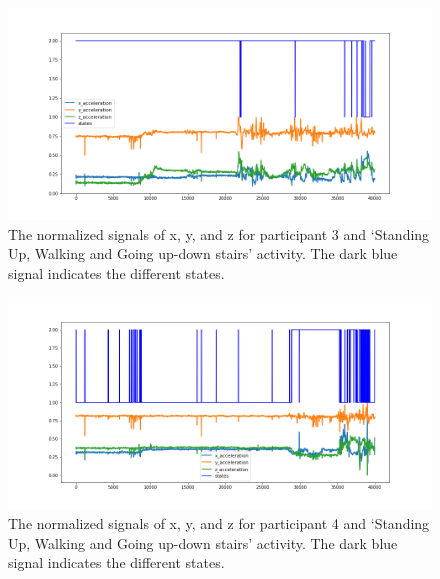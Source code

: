 \begin{figure}[H]
    \centering
    \begin{minipage}[b]{1\textwidth}
        \includegraphics[width=\textwidth]{manuscript/src/figures/Ass3/Ass3_Q2_states_user_2N.png}
    \end{minipage}
    \caption{The normalized signals of x, y, and z for participant 3 and ‘Standing  Up,  Walking  and  Going  up-down  stairs’ activity. The dark blue signal indicates the different states.}
    \label{fig:Ass3_Q2_states_user_2N}
\end{figure}
\begin{figure}[H]
    \centering
    \begin{minipage}[b]{1\textwidth}
        \includegraphics[width=\textwidth]{manuscript/src/figures/Ass3/Ass3_Q2_states_user_3N.png}
    \end{minipage}
    \caption{The normalized signals of x, y, and z for participant 4 and ‘Standing  Up,  Walking  and  Going  up-down  stairs’ activity. The dark blue signal indicates the different states.}
    \label{fig:Ass3_Q2_states_user_3N}
\end{figure}
